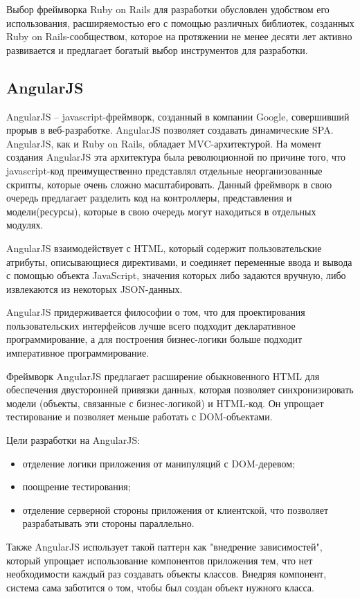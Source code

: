 Выбор фреймворка Ruby on Rails для разработки обусловлен удобством его использования, расширяемостью его с помощью различных библиотек, созданных Ruby on Rails-сообществом, которое на протяжении не менее десяти лет активно развивается и предлагает богатый выбор инструментов для разработки.

\subsection{AngularJS}
\label{sub:technologies:angular_js}
AngularJS -- javascript-фреймворк, созданный в компании Google, совершивший прорыв в веб-разработке. AngularJS позволяет создавать динамические SPA. AngularJS, как и Ruby on Rails, обладает MVC-архитектурой. На момент создания AngularJS эта архитектура была революционной по причине того, что javascript-код преимущественно представлял отдельные неорганизованные скрипты, которые очень сложно масштабировать. Данный фреймворк в свою очередь предлагает разделить код на контроллеры, представления и модели(ресурсы), которые в свою очередь могут находиться в отдельных модулях.

AngularJS взаимодействует с HTML, который содержит пользовательские атрибуты, описывающиеся директивами, и соединяет переменные ввода и вывода с помощью объекта JavaScript, значения которых либо задаются вручную, либо извлекаются из некоторых JSON-данных.

AngularJS придерживается философии о том, что для проектирования пользовательских интерфейсов лучше всего подходит декларативное программирование, а для построения бизнес-логики больше подходит императивное программирование.

Фреймворк AngularJS предлагает расширение обыкновенного HTML для обеспечения двусторонней привязки данных, которая позволяет синхронизировать модели (объекты, связанные с бизнес-логикой) и HTML-код. Он упрощает тестирование и позволяет меньше работать с DOM-объектами.

Цели разработки на AngularJS:

\begin{itemize}
  \item отделение логики приложения от манипуляций с DOM-деревом;
  \item поощрение тестирования;
  \item отделение серверной стороны приложения от клиентской, что позволяет разрабатывать эти стороны параллельно.
\end{itemize}

Также AngularJS использует такой паттерн как "внедрение зависимостей", который упрощает использование компонентов приложения тем, что нет необходимости каждый раз создавать объекты классов. Внедряя компонент, система сама заботится о том, чтобы был создан объект нужного класса.

